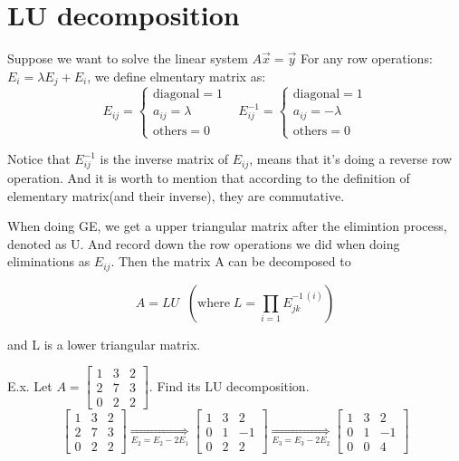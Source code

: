 	
	
	
	\section{LU decomposition}
	Suppose we want to solve the linear system $ A\vec{x} = \vec{y}$
	For any row operations: $E_i = \lambda E_j + E_i$, we define elmentary matrix as:
	\[ E_{ij} = \left \{\begin{matrix}
	\text{diagonal} = 1\\
	a_{ij} = \lambda\\
	\text{others} = 0
	\end{matrix} \right. 
	\;\; \;
	E_{ij}^{-1} =\left\{  \begin{matrix}
	\text{diagonal} = 1\\
	a_{ij} = -\lambda\\
	\text{others} = 0
	\end{matrix} \right.
	\]
	
	Notice that $E_{ij}^{-1}$ is the inverse matrix of $E_{ij}$, means that it's doing a reverse row operation. And it is worth to mention that according to the definition of elementary matrix(and their inverse), they are commutative.
	
	When doing GE, we get a upper triangular matrix after the elimintion process, denoted as U. And record down the row operations we did when doing eliminations as $E_{ij}$. Then the matrix A can be decomposed to

	\[ A =  LU \;\; (\text{where}\; L =\prod_{i=1} E_{jk}^{-1\,(i)})\]
	
	and L is a lower triangular matrix.
	
	E.x. Let $A = \begin{bmatrix} 1 & 3 & 2 \\ 2 & 7 & 3 \\ 0 & 2 & 2 \end{bmatrix}$.  Find its LU decomposition. 
		\[ \begin{bmatrix} 1 & 3 & 2 \\ 2 & 7 & 3 \\ 0 & 2 & 2 \end{bmatrix} 
		\underset{E_2 = E_2 -2E_1}{\Rightarrow} \begin{bmatrix} 1 & 3 & 2 \\ 0 & 1 & -1 \\ 0 & 2 & 2 \end{bmatrix}
		\underset{E_3 = E_3 -2E_2}{\Rightarrow} \begin{bmatrix} 1 & 3 & 2 \\ 0 & 1 & -1 \\ 0 & 0 & 4 \end{bmatrix}\]
	

